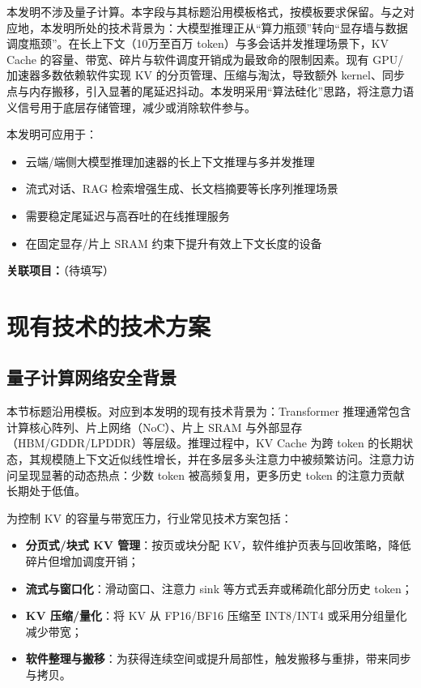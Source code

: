 \documentclass[12pt,a4paper]{article}
\begin{document}
本发明不涉及量子计算。本字段与其标题沿用模板格式，按模板要求保留。与之对应地，本发明所处的技术背景为：大模型推理正从“算力瓶颈”转向“显存墙与数据调度瓶颈”。在长上下文（10万至百万 token）与多会话并发推理场景下，KV Cache 的容量、带宽、碎片与软件调度开销成为最致命的限制因素。现有 GPU/加速器多数依赖软件实现 KV 的分页管理、压缩与淘汰，导致额外 kernel、同步点与内存搬移，引入显著的尾延迟抖动。本发明采用“算法硅化”思路，将注意力语义信号用于底层存储管理，减少或消除软件参与。

本发明可应用于：
\begin{itemize}
    \item 云端/端侧大模型推理加速器的长上下文推理与多并发推理
    \item 流式对话、RAG 检索增强生成、长文档摘要等长序列推理场景
    \item 需要稳定尾延迟与高吞吐的在线推理服务
    \item 在固定显存/片上 SRAM 约束下提升有效上下文长度的设备
\end{itemize}

\textbf{关联项目：}\underline{\hspace{8cm}}（待填写）

\section{现有技术的技术方案}

\subsection{量子计算网络安全背景}

本节标题沿用模板。对应到本发明的现有技术背景为：Transformer 推理通常包含计算核心阵列、片上网络（NoC）、片上 SRAM 与外部显存（HBM/GDDR/LPDDR）等层级。推理过程中，KV Cache 为跨 token 的长期状态，其规模随上下文近似线性增长，并在多层多头注意力中被频繁访问。注意力访问呈现显著的动态热点：少数 token 被高频复用，更多历史 token 的注意力贡献长期处于低值。

为控制 KV 的容量与带宽压力，行业常见技术方案包括：
\begin{itemize}
    \item \textbf{分页式/块式 KV 管理}：按页或块分配 KV，软件维护页表与回收策略，降低碎片但增加调度开销；
    \item \textbf{流式与窗口化}：滑动窗口、注意力 sink 等方式丢弃或稀疏化部分历史 token；
    \item \textbf{KV 压缩/量化}：将 KV 从 FP16/BF16 压缩至 INT8/INT4 或采用分组量化减少带宽；
    \item \textbf{软件整理与搬移}：为获得连续空间或提升局部性，触发搬移与重排，带来同步与拷贝。
\end{itemize}
\end{document}
